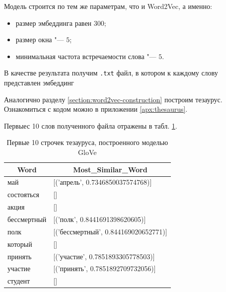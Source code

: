 \documentclass[coursework]{SCWorks}
\begin{document}
Модель строится по тем же параметрам, что и Word2Vec, а именно:
\begin{itemize}
    \item размер эмбеддинга равен $300$;
    \item размер окна "--- $5$;
    \item минимальная частота встречаемости слова "--- $5$.
\end{itemize}

В качестве результата получим \verb|.txt| файл, в котором к каждому слову представлен эмбеддинг

Аналогично разделу \ref{section:word2vec-construction} построим тезаурус. Ознакомиться с кодом можно в приложении \ref{apx:thesaurus}.

Первыес 10 слов полученного файла отражены в табл. \ref{table:glove-example}.

\begin{table}[!h]
    \centering
    \footnotesize
    \caption{Первые 10 строчек тезауруса, построенного моделью GloVe}
    \begin{tabular}{|l|l|}
        \hline
        \multicolumn{1}{|c|}{\textbf{Word}} & \multicolumn{1}{c|}{\textbf{Most\_Similar\_Word}} \\ \hline
        май                                 & {[}('апрель', 0.7346850037574768){]}              \\ \hline
        состояться                          & {[}{]}                                            \\ \hline
        акция                               & {[}{]}                                            \\ \hline
        бессмертный                         & {[}('полк', 0.8441691398620605){]}                \\ \hline
        полк                                & {[}('бессмертный', 0.844169020652771){]}          \\ \hline
        который                             & {[}{]}                                            \\ \hline
        принять                             & {[}('участие', 0.7851893305778503){]}             \\ \hline
        участие                             & {[}('принять', 0.7851892709732056){]}             \\ \hline
        студент                             & {[}{]}                                            \\ \hline
    \end{tabular}
    \label{table:glove-example}
\end{table}
\end{document}
